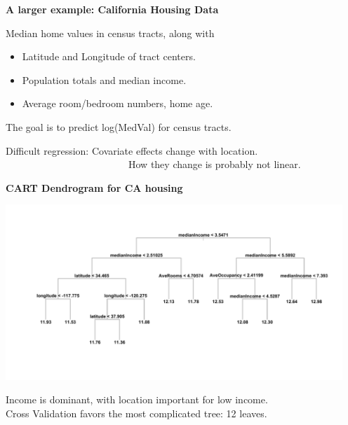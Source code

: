 \documentclass[11pt,xcolor=svgnames]{beamer}
\newcommand{\theme}{\color{Maroon}}
\newcommand{\gr}{\color{black!60}}
\newcommand{\sg}{\color{DarkSlateGray}}
\newcommand{\nv}{\color{Navy}}
\newcommand{\sk}{\vspace{.5cm}}
\begin{document}
\begin{frame}

{\bf A larger example: \theme California Housing Data}

\sk
Median home values in census tracts, along with
\begin{itemize}
\item Latitude and Longitude of tract centers.
\item Population totals and median income.
\item Average room/bedroom numbers, home age.
\end{itemize}
The goal is to predict {\nv log(MedVal)} for census tracts.


\sk
Difficult regression: \sg Covariate effects change with location.
\\\gr ~~~~~~~~~~~~~~~~~~~~~~~~~How they change is probably not linear.
\end{frame}


\begin{frame}

{\bf \theme CART Dendrogram for  CA housing}


\vspace{-1cm}
\begin{adjustwidth}{-.5in}{}
\includegraphics[width=5in]{../graphs/CAHtree}
\end{adjustwidth}

\vspace{-1cm}
\sg Income is dominant, with location important for low income.\\
\gr  Cross Validation favors the most complicated tree: 12 leaves.
\end{frame}
\end{document}
